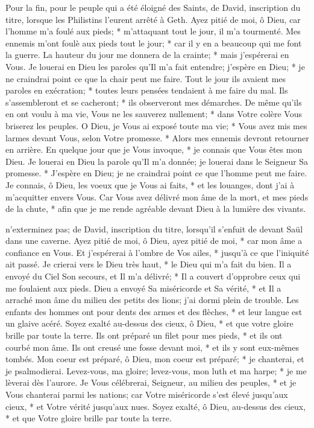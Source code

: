 Pour la fin, pour le peuple qui a été éloigné des Saints, de David, inscription du titre, lorsque les Philistins l'eurent arrêté à Geth.
Ayez pitié de moi, ô Dieu, car l'homme m'a foulé aux pieds; * m'attaquant tout le jour, il m'a tourmenté.
Mes ennemis m'ont foulè aux pieds tout le jour; * car il y en a beaucoup qui me font la guerre.
La hauteur du jour me donnera de la crainte; * mais j'espérerai en Vous.
Je louerai en Dieu les paroles qu'Il m'a fait entendre; j'espère en Dieu; * je ne craindrai point ce que la chair peut me faire.
Tout le jour ils avaient mes paroles en exécration; * toutes leurs pensées tendaient à me faire du mal.
Ils s'assembleront et se cacheront; * ils observeront mes démarches. De même qu'ils en ont voulu à ma vie,
Vous ne les sauverez nullement; * dans Votre colère Vous briserez les peuples. O Dieu,
je Vous ai exposé toute ma vie; * Vous avez mis mes larmes devant Vous, selon Votre promesse. *
Alors mes ennemis devront retourner en arrière. En quelque jour que je Vous invoque, * je connais que Vous êtes mon Dieu.
Je louerai en Dieu la parole qu'Il m'a donnée; je louerai dans le Seigneur Sa promesse. * J'espère en Dieu; je ne craindrai point ce que l'homme peut me faire.
Je connais, ô Dieu, les voeux que je Vous ai faits, * et les louanges, dont j'ai à m'acquitter envers Vous.
Car Vous avez délivré mon âme de la mort, et mes pieds de la chute, * afin que je me rende agréable devant Dieu à la lumière des vivants.

n'exterminez pas; de David, inscription du titre, lorsqu'il s'enfuit de devant Saül dans une caverne.
Ayez pitié de moi, ô Dieu, ayez pitié de moi, * car mon âme a confiance en Vous. Et j'espérerai à l'ombre de Vos ailes, * jusqu'à ce que l'iniquité ait passé.
Je crierai vers le Dieu très haut, * le Dieu qui m'a fait du bien.
Il a envoyé du Ciel Son secours, et Il m'a délivré; * Il a couvert d'opprobre ceux qui me foulaient aux pieds. Dieu a envoyé Sa miséricorde et Sa vérité, *
et Il a arraché mon âme du milieu des petits des lions; j'ai dormi plein de trouble. Les enfants des hommes ont pour dents des armes et des flèches, * et leur langue est un glaive acéré.
Soyez exalté au-dessus des cieux, ô Dieu, * et que votre gloire brille par toute la terre.
Ils ont préparé un filet pour mes pieds, * et ils ont courbé mon âme. Ils ont creusé une fosse devant moi, * et ils y sont eux-mêmes tombés.
Mon coeur est préparé, ô Dieu, mon coeur est préparé; * je chanterai, et je psalmodierai.
Levez-vous, ma gloire; levez-vous, mon luth et ma harpe; * je me lèverai dès l'aurore.
Je Vous célébrerai, Seigneur, au milieu des peuples, * et je Vous chanterai parmi les nations;
car Votre miséricorde s'est élevé jusqu'aux cieux, * et Votre vérité jusqu'aux nues.
Soyez exalté, ô Dieu, au-dessus des cieux, * et que Votre gloire brille par toute la terre.

